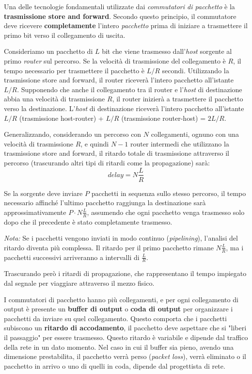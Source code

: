 Una delle tecnologie fondamentali utilizzate dai \textit{commutatori di pacchetto} è la \textbf{trasmissione store and forward}. Secondo questo principio, il commutatore deve ricevere \textbf{completamente} l'intero \textit{pacchetto} prima di iniziare a trasmettere il primo bit verso il collegamento di uscita.

Consideriamo un pacchetto di $L$ bit che viene trasmesso dall'\textit{host} sorgente al primo \textit{router} sul percorso. Se la velocità di trasmissione del collegamento è $R$, il tempo necessario per trasmettere il pacchetto è $L/R$ secondi. Utilizzando la trasmissione store and forward, il router riceverà l'intero pacchetto all'istante $L/R$. Supponendo che anche il collegamento tra il router e l'\textit{host} di destinazione abbia una velocità di trasmissione $R$, il router inizierà a trasmettere il pacchetto verso la destinazione. L'\textit{host} di destinazione riceverà l'intero pacchetto all'istante $L/R$ (trasmissione host-router) + $L/R$ (trasmissione router-host) = $2L/R$.

Generalizzando, considerando un percorso con $N$ collegamenti, ognuno con una velocità di trasmissione $R$, e quindi $N-1$ router intermedi che utilizzano la trasmissione store and forward, il ritardo totale di trasmissione attraverso il percorso (trascurando altri tipi di ritardi come la propagazione) sarà:
\[
  delay = N \frac{L}{R}
\]

Se la sorgente deve inviare $P$ pacchetti in sequenza sullo stesso percorso, il tempo necessario affinché l'ultimo pacchetto raggiunga la destinazione sarà approssimativamente $P \cdot N \frac{L}{R}$, assumendo che ogni pacchetto venga trasmesso solo dopo che il precedente è stato completamente trasmesso.

\textit{Nota:} Se i pacchetti vengono inviati in modo continuo (\textit{pipelining}), l'analisi del ritardo diventa più complessa. Il ritardo per il primo pacchetto rimane $N \frac{L}{R}$, ma i pacchetti successivi arriveranno a intervalli di $\frac{L}{R}$.

Trascurando però i ritardi di propagazione, che rappresentano il tempo impiegato dal segnale per viaggiare attraverso il mezzo fisico.

I commutatori di pacchetto hanno più collegamenti, e per ogni collegamento di output è presente un \textbf{buffer di output} o \textbf{coda di output} per organizzare i pacchetti da inviare su quel collegamento. Questo comporta che i pacchetti subiscono un \textbf{ritardo di accodamento}, il pacchetto deve aspettare che si "liberi il passaggio" per essere trasmesso. Questo ritardo è variabile e dipende dal traffico della rete in un dato momento. Nel caso in cui il buffer sia pieno, avendo una dimensione prestabilita, il pacchetto verrà perso (\textit{packet loss}), verrà eliminato o il pacchetto in arrivo o uno di quelli in coda, dipende dal progettista di rete.

